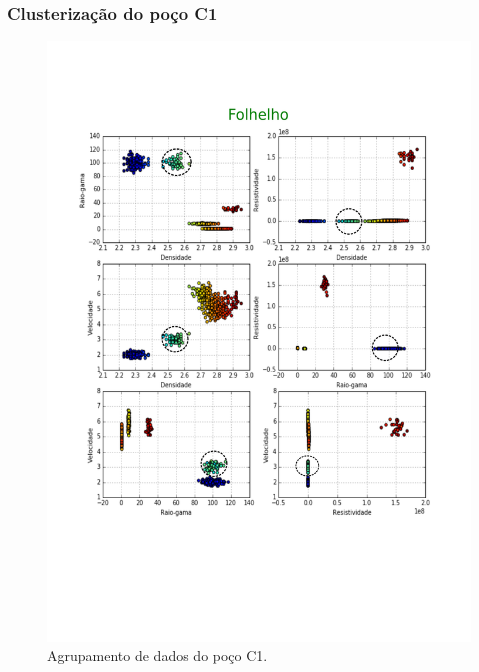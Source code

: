 \documentclass[10pt]{beamer} %
\begin{document}
\begin{frame}
	\frametitle{Clusterização do poço C1}
	\begin{figure}[H]
		\centering
		\includegraphics[scale=0.3]{Imagens/folhelhoC1.png}
		\caption{Agrupamento de dados do poço C1.}
	\end{figure} 
\end{frame}
\end{document}
